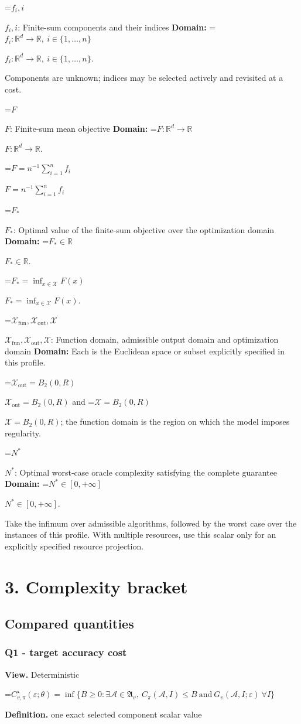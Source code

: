 \documentclass[10pt,a4paper]{article}
\newcommand{\AtlasMath}[1]{\par\begingroup\centering\setbox0=\hbox{$\displaystyle #1$}\ifdim\wd0>1.4\linewidth\typeout{ATLAS WIDE FORMULA: \the\wd0}\fi\ifdim\wd0>\linewidth\resizebox{\linewidth}{!}{\box0}\else\box0\fi\par\endgroup}
\newcommand{\AtlasInlineMath}[1]{\begingroup\setbox0=\hbox{$#1$}\ifdim\wd0>.4\linewidth\endgroup\AtlasMath{#1}\else\endgroup$#1$\fi}
\begin{document}
\AtlasInlineMath{f_i,i}: Finite-sum components and their indices \textbf{Domain:} \AtlasInlineMath{f_i:\mathbb{R}^d\to\mathbb{R},\ i\in\{1,\ldots,n\}}.

Components are unknown; indices may be selected actively and revisited at a cost.

\AtlasInlineMath{F}: Finite-sum mean objective \textbf{Domain:} \AtlasInlineMath{F:\mathbb{R}^d\to\mathbb{R}}.

\AtlasInlineMath{F=n^{-1}\sum_{i=1}^n f_i}

\AtlasInlineMath{F_*}: Optimal value of the finite-sum objective over the optimization domain \textbf{Domain:} \AtlasInlineMath{F_*\in\mathbb{R}}.

\AtlasInlineMath{F_*=\inf_{x\in\mathcal{X}}F(x)}.

\AtlasInlineMath{\mathcal{X}_{\mathrm{fun}},\mathcal{X}_{\mathrm{out}},\mathcal{X}}: Function domain, admissible output domain and optimization domain \textbf{Domain:} Each is the Euclidean space or subset explicitly specified in this profile.

\AtlasInlineMath{\mathcal{X}_{\mathrm{out}}=B_2(0,R)} and \AtlasInlineMath{\mathcal{X}=B_2(0,R)}; the function domain is the region on which the model imposes regularity.

\AtlasInlineMath{N^*}: Optimal worst-case oracle complexity satisfying the complete guarantee \textbf{Domain:} \AtlasInlineMath{N^*\in[0,+\infty]}.

Take the infimum over admissible algorithms, followed by the worst case over the instances of this profile. With multiple resources, use this scalar only for an explicitly specified resource projection.

\section{3. Complexity bracket}
\subsection{Compared quantities}
\subsubsection{Q1 - target accuracy cost}
\textbf{View.} Deterministic

\AtlasMath{C^\star_{v,\pi}(\varepsilon;\theta)=\inf\{B\ge0:\exists\mathcal A\in\mathfrak A_v,\ C_\pi(\mathcal A,I)\le B\ \text{and}\ G_v(\mathcal A,I;\varepsilon)\ \forall I\}}
\textbf{Definition.} one exact selected component scalar value
\end{document}
